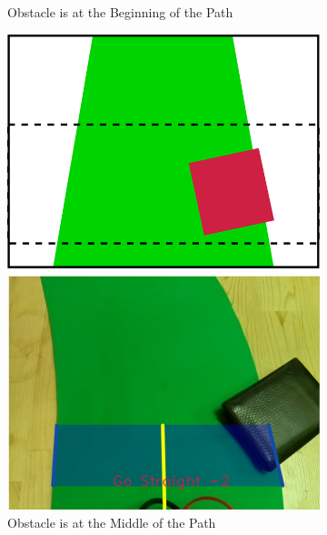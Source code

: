 \documentclass[a4paper,12pt]{article}
\begin{document}
\begin{figure}[H]
\begin{subfigure}{.31\textwidth}
		\caption{\label{fig:dataP_down_1} Obstacle is at the Beginning of the Path}
	\end{subfigure}%
	\begin{subfigure}{.31\textwidth}
		\centering
		\includegraphics[width=0.30\unitlength]{images/path_images/down_2}
		\caption{\label{fig:dataP_down_2} Obstacle is at the Middle of the Path}
	\end{subfigure}
		\begin{subfigure}{.31\textwidth}
		\centering

\end{subfigure}
\end{figure}
\end{document}
